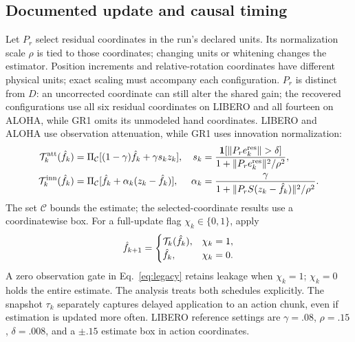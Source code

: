 \subsection{Documented update and causal timing}
Let $P_r$ select residual coordinates in the run's declared units. Its
normalization scale $\rho$ is tied to those coordinates; changing units or
whitening changes the estimator. Position increments and relative-rotation
coordinates have different physical units; exact scaling must accompany each
configuration. $P_r$ is distinct from
$D$: an uncorrected coordinate can still alter the shared gain; the
recovered configurations use all six residual coordinates on LIBERO and all
fourteen on ALOHA, while GR1 omits its unmodeled hand coordinates. LIBERO and ALOHA use observation attenuation,
while GR1 uses innovation normalization:
\begin{align}
\mathcal T_k^{\rm att}(\fhat_k)
&=\Pi_{\mathcal C}[(1-\gamma)\fhat_k+\gamma s_kz_k],
&s_k&=\frac{\mathbf1[\|P_re_k^{\rm res}\|>\delta]}{1+\|P_re_k^{\rm res}\|^2/\rho^2},
\label{eq:legacy}\\
\mathcal T_k^{\rm inn}(\fhat_k)
&=\Pi_{\mathcal C}[\fhat_k+\alpha_k(z_k-\fhat_k)],
&\alpha_k&=\frac{\gamma}{1+\|P_rS(z_k-\fhat_k)\|^2/\rho^2}.
\label{eq:innovation}
\end{align}
The set $\mathcal C$ bounds the estimate; the selected-coordinate results use a coordinatewise box. For a full-update flag
$\chi_k\in\{0,1\}$, apply
\begin{equation}
\hat f_{k+1}=\begin{cases}\mathcal T_k(\hat f_k),&\chi_k=1,\\
\hat f_k,&\chi_k=0.\end{cases}
\label{eq:method-schedule}
\end{equation}
A zero observation gate in Eq.~\eqref{eq:legacy} retains leakage when
$\chi_k=1$; $\chi_k=0$ holds the entire estimate. The analysis treats both
schedules explicitly. The snapshot $\tau_k$ separately captures delayed
application to an action chunk, even if estimation is updated more often.
LIBERO reference settings are $\gamma=.08$, $\rho=.15$, $\delta=.008$,
and a $\pm.15$ estimate box in action coordinates.

